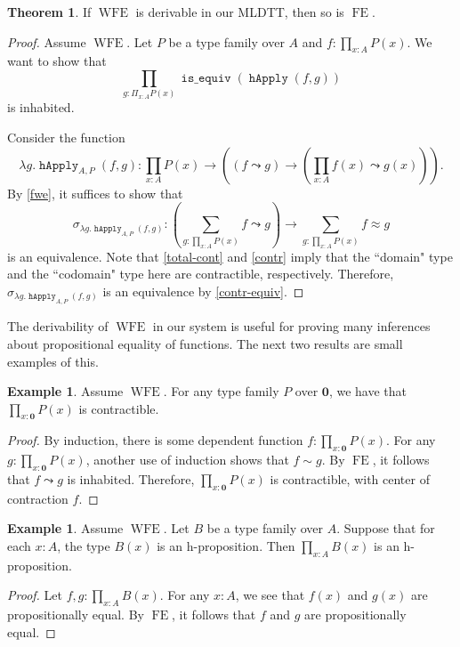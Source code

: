 \documentclass[10pt,letterpaper,cm]{nupset}
\theoremstyle{definition}
\newtheorem{exmp}[definition]{Example}
\theoremstyle{theorem}
\newtheorem{theorem}[definition]{Theorem}
\theoremstyle{remark}
\newcommand{\0}{\mathbf{0}}
\newcommand{\1}{\mathbf{1}}
\newcommand{\2}{\mathbf{2}}
\DeclareMathOperator{\happly}{\mathtt{hApply}}
\DeclareMathOperator{\isequiv}{\mathtt{is\_equiv}}
\DeclareMathOperator{\wfe}{\mathrm{WFE}}
\DeclareMathOperator{\sfe}{\mathrm{FE}}
\begin{document}
\begin{theorem}\label{wfe-sfe}
If $\wfe$ is derivable in our MLDTT, then so is $\sfe$.
\end{theorem}
\begin{proof}
Assume $\wfe.$  Let $P$ be a type family over $A$ and $f: \prod_{x:A}P(x)$.  
We want to show that $$\prod_{g: \Pi_{x:A} P(x)} \isequiv\left(\happly(f,g)\right)$$ is inhabited.
\smallskip

Consider the function $$  \lambda g. \happly_{A,P}(f,g) : \prod_{x:A}P(x) \to \left(\left(f \leadsto g\right) \to \left( \prod_{x:A} f(x) \leadsto g(x) \right) \right).$$
By \cref{fwe}, it suffices to show that $$\sigma_{ \lambda g. \happly_{A,P}(f,g)} : \left(\sum_{g : \prod_{x:A} P(x)} f \leadsto g \right) \to \sum_{g: \prod_{x:A} P(x)} f\approx g $$ is an equivalence.   Note that \cref{total-cont} and \cref{contr} imply that the ``domain" type and the ``codomain" type here are contractible, respectively.  Therefore, $\sigma_{ \lambda g. \happly_{A,P}(f,g)}$ is an equivalence  by \cref{contr-equiv}.
\end{proof}

The derivability of $\wfe$ in our system is useful for proving many inferences about propositional equality of functions. The next two results are small examples of this.

\begin{exmp}\label{bot-cont}
Assume $\wfe$. For any type family $P$ over $\0$, we have that $\prod_{x:\0} P(x)$ is contractible. 
\end{exmp}
\begin{proof}
By induction, there is some dependent function $f : \prod_{x: \0} P(x)$. For any $g : \prod_{x:\0}P(x)$, another use of induction shows that $f \sim g$. By $\sfe$, it follows that $f \leadsto g$ is inhabited. Therefore, $\prod_{x:\0} P(x)$ is contractible, with center of contraction $f$. 
\end{proof}

\begin{exmp}\label{prod-prop}
Assume $\wfe$. Let $B$ be a type family over $A$. Suppose that for each $x:A$, the type $B(x)$ is an h-proposition. Then $\prod_{x:A}B(x)$ is an h-proposition.
\end{exmp}
\begin{proof}
Let $f, g: \prod_{x:A}B(x)$. For any $x:A$, we see that $f(x)$ and $g(x)$ are propositionally equal. By $\sfe$, it follows that $f$ and $g$ are propositionally equal. 
\end{proof}
\end{document}
